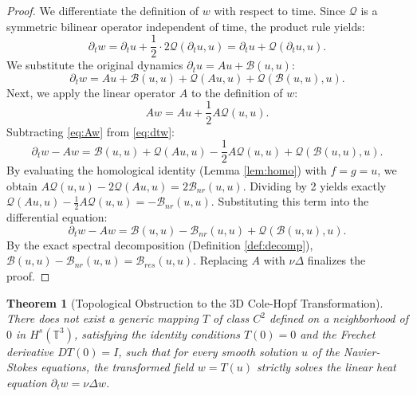 \documentclass[12pt,a4paper]{article}
\theoremstyle{plain}
\newtheorem{theorem}{Theorem}[section]
\theoremstyle{definition}
\theoremstyle{remark}
\newcommand{\Hs}{H^s}
\newcommand{\T}{\mathbb{T}}
\newcommand{\BB}{\mathcal{B}}
\newcommand{\Bnr}{\mathcal{B}_{nr}}
\newcommand{\Bres}{\mathcal{B}_{res}}
\newcommand{\QQ}{\mathcal{Q}}
\begin{document}
\begin{proof}
We differentiate the definition of $w$ with respect to time. Since $\QQ$ is a symmetric bilinear operator independent of time, the product rule yields:
\[
  \partial_t w = \partial_t u + \frac{1}{2} \cdot 2\QQ(\partial_t u, u) = \partial_t u + \QQ(\partial_t u, u).
\]
We substitute the original dynamics $\partial_t u = Au + \BB(u,u)$:
\begin{equation}
  \partial_t w = Au + \BB(u,u) + \QQ(Au,u) + \QQ(\BB(u,u),u). \label{eq:dtw}
\end{equation}
Next, we apply the linear operator $A$ to the definition of $w$:
\begin{equation}
  Aw = Au + \frac{1}{2}A\QQ(u,u). \label{eq:Aw}
\end{equation}
Subtracting \eqref{eq:Aw} from \eqref{eq:dtw}:
\[
  \partial_t w - Aw = \BB(u,u) + \QQ(Au,u) - \frac{1}{2}A\QQ(u,u) + \QQ(\BB(u,u),u).
\]
By evaluating the homological identity (Lemma \ref{lem:homo}) with $f=g=u$, we obtain $A\QQ(u,u) - 2\QQ(Au,u) = 2\Bnr(u,u)$. Dividing by 2 yields exactly $\QQ(Au,u) - \frac{1}{2}A\QQ(u,u) = -\Bnr(u,u)$. 
Substituting this term into the differential equation:
\[
  \partial_t w - Aw = \BB(u,u) - \Bnr(u,u) + \QQ(\BB(u,u),u).
\]
By the exact spectral decomposition (Definition \ref{def:decomp}), $\BB(u,u) - \Bnr(u,u) = \Bres(u,u)$. Replacing $A$ with $\nu\Delta$ finalizes the proof.
\end{proof}

\begin{theorem}[Topological Obstruction to the 3D Cole-Hopf Transformation]
\label{thm:obstruction}
There does not exist a generic mapping $T$ of class $C^2$ defined on a neighborhood of $0$ in $\Hs(\T^3)$, satisfying the identity conditions $T(0)=0$ and the Frechet derivative $DT(0)=I$, such that for every smooth solution $u$ of the Navier-Stokes equations, the transformed field $w = T(u)$ strictly solves the linear heat equation $\partial_t w = \nu\Delta w$.
\end{theorem}
\end{document}
